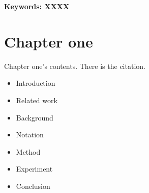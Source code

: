 \documentclass[12pt, a4paper]{report}
\begin{document}
\vspace{2em}
\par \noindent\textbf{Keywords: XXXX}


\newpage
\pagestyle{fancy}

\lhead{\Etitle}
    \setlength{\parskip}{0pt}

\tableofcontents



\newpage


\listoffigures

\lhead{\Etitle}
    \setlength{\parskip}{0pt}

\newpage

\listoftables

\lhead{\Etitle}
    \setlength{\parskip}{0pt}


\pagestyle{fancy}
\newpage
\chapter{Chapter one}




\lhead{\Etitle}
    \setlength{\parskip}{0pt}
   
Chapter one's contents. There is the citation. \cite{DBLP:journals/corr/ReedAYLSL16,7780634}

\begin{itemize}
    \item Introduction
    \item Related work
    \item Background
    \item Notation
    \item Method
    \item Experiment
    \item Conclusion
\end{itemize}
\end{document}

